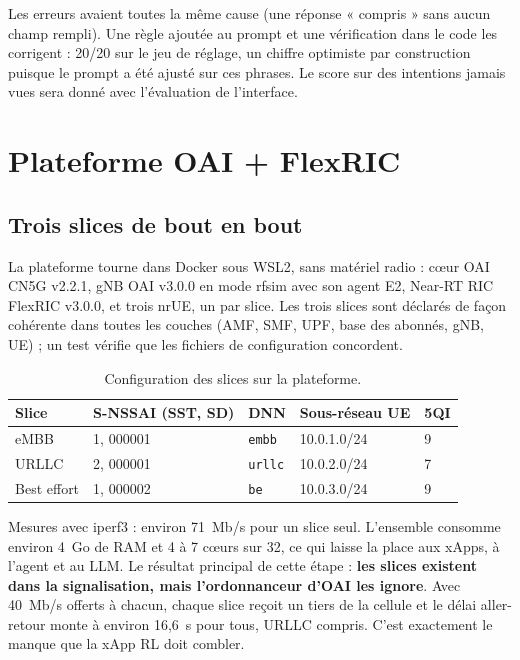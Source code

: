 \documentclass[11pt,a4paper]{article}
\newcommand{\tool}[1]{\texttt{#1}}
\begin{document}
Les erreurs avaient toutes la même cause (une réponse « compris » sans aucun champ rempli). Une
règle ajoutée au prompt et une vérification dans le code les corrigent : 20/20 sur le jeu de
réglage, un chiffre optimiste par construction puisque le prompt a été ajusté sur ces phrases. Le
score sur des intentions jamais vues sera donné avec l'évaluation de l'interface.

\section{Plateforme OAI + FlexRIC}

\subsection{Trois slices de bout en bout}

La plateforme tourne dans Docker sous WSL2, sans matériel radio : c\oe ur OAI CN5G v2.2.1,
gNB OAI v3.0.0 en mode rfsim avec son agent E2, Near-RT RIC FlexRIC v3.0.0, et trois nrUE, un par
slice. Les trois slices sont déclarés de façon cohérente dans toutes les couches (AMF, SMF, UPF,
base des abonnés, gNB, UE) ; un test vérifie que les fichiers de configuration concordent.

\begin{table}[!htb]
\centering\small
\begin{tabularx}{\textwidth}{@{}P{2.6cm}P{3.2cm}P{2.2cm}P{2.8cm}L@{}}
\toprule
Slice & S-NSSAI (SST, SD) & DNN & Sous-réseau UE & 5QI\\
\midrule
eMBB & 1, 000001 & \tool{embb} & 10.0.1.0/24 & 9\\
URLLC & 2, 000001 & \tool{urllc} & 10.0.2.0/24 & 7\\
Best effort & 1, 000002 & \tool{be} & 10.0.3.0/24 & 9\\
\bottomrule
\end{tabularx}
\caption{Configuration des slices sur la plateforme.}
\end{table}

Mesures avec iperf3 : environ 71~Mb/s pour un slice seul. L'ensemble consomme environ 4~Go de
RAM et 4 à 7 c\oe urs sur 32, ce qui laisse la place aux xApps, à l'agent et au LLM. Le résultat
principal de cette étape : \textbf{les slices existent dans la signalisation, mais
l'ordonnanceur d'OAI les ignore}. Avec 40~Mb/s offerts à chacun, chaque slice reçoit un tiers de la
cellule et le délai aller-retour monte à environ 16,6~s pour tous, URLLC compris. C'est exactement
le manque que la xApp RL doit combler.
\end{document}
